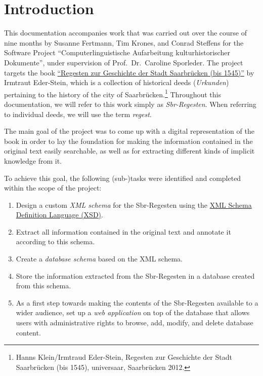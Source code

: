 \section{Introduction}
\label{sec:intro}

This documentation accompanies work that was carried out over the
course of nine months by Susanne Fertmann, Tim Krones, and Conrad
Steffens for the Software Project ``Computerlinguistische Aufarbeitung
kulturhistorischer Dokumente'', under supervision of
Prof.~Dr.~Caroline Sporleder. The project targets the book
\href{http://universaar.uni-saarland.de/monographien/volltexte/2012/82/pdf/regesten.pdf}{``Regesten
  zur Geschichte der Stadt Saarbrücken (bis 1545)''} by Irmtraut
Eder-Stein, which is a collection of historical deeds
(\emph{Urkunden}) pertaining to the history of the city of
Saarbrücken.\footnote{Hanns Klein/Irmtraud Eder-Stein, Regesten zur
  Geschichte der Stadt Saarbrücken (bis 1545), universaar, Saarbrücken
  2012.} Throughout this documentation, we will refer to this work
simply as \emph{Sbr-Regesten}. When referring to individual deeds, we
will use the term \emph{regest}.

The main goal of the project was to come up with a digital
representation of the book in order to lay the foundation for making
the information contained in the original text easily searchable, as
well as for extracting different kinds of implicit knowledge from it.

To achieve this goal, the following (sub-)tasks were identified and
completed within the scope of the project:

\begin{enumerate}
\item Design a custom \emph{XML schema} for the Sbr-Regesten using the
  \href{https://en.wikipedia.org/wiki/XML_Schema_(W3C)}{XML Schema
    Definition Language (XSD)}.
\item Extract all information contained in the original text and
  annotate it according to this schema.
\item Create a \emph{database schema} based on the XML schema.
\item Store the information extracted from the Sbr-Regesten in a
  database created from this schema.
\item As a first step towards making the contents of the Sbr-Regesten
  available to a wider audience, set up a \emph{web application} on
  top of the database that allows users with administrative rights to
  browse, add, modify, and delete database content.
\end{enumerate}

